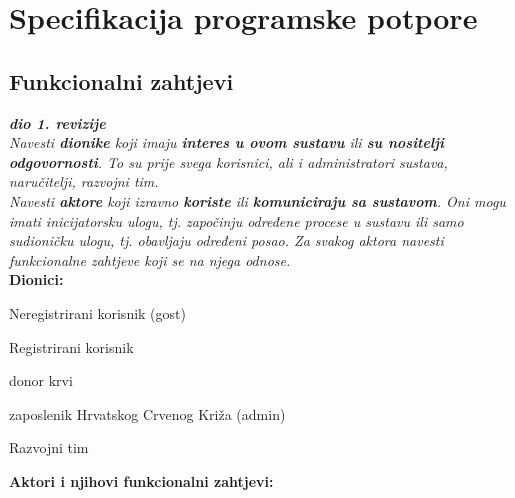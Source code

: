 \chapter{Specifikacija programske potpore}
		
	\section{Funkcionalni zahtjevi}
			
			\textbf{\textit{dio 1. revizije}}\\
			
			\textit{Navesti \textbf{dionike} koji imaju \textbf{interes u ovom sustavu} ili  \textbf{su nositelji odgovornosti}. To su prije svega korisnici, ali i administratori sustava, naručitelji, razvojni tim.}\\
				
			\textit{Navesti \textbf{aktore} koji izravno \textbf{koriste} ili \textbf{komuniciraju sa sustavom}. Oni mogu imati inicijatorsku ulogu, tj. započinju određene procese u sustavu ili samo sudioničku ulogu, tj. obavljaju određeni posao. Za svakog aktora navesti funkcionalne zahtjeve koji se na njega odnose.}\\
			
			
			\noindent \textbf{Dionici:}
			
			\begin{packed_enum}
				
				\item Neregistrirani korisnik (gost)
				\item Registrirani korisnik
				\begin{packed_enum}
					\item donor krvi
					\item zaposlenik Hrvatskog Crvenog Križa (admin)
				\end{packed_enum}
				\item Razvojni tim
				
			\end{packed_enum}
			
			\noindent \textbf{Aktori i njihovi funkcionalni zahtjevi:}
			
